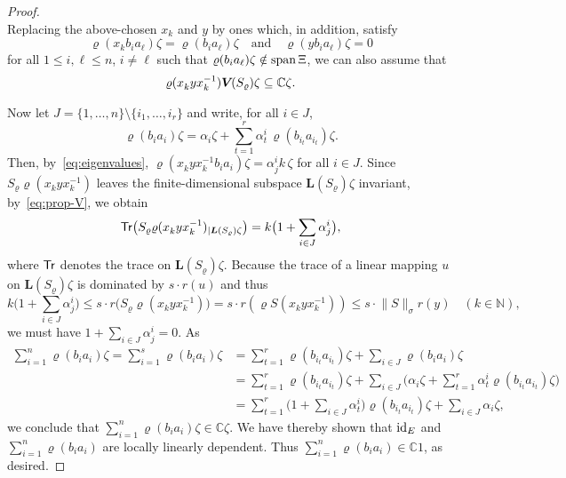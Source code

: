 \documentclass[a4paper,12pt,reqno]{amsart}
\numberwithin{equation}{section}
\theoremstyle{definition}
\begin{document}
\begin{proof}
\begin{equation}
\end{equation}
Replacing the above-chosen $x_k$ and $y$ by ones which, in addition, satisfy
\begin{equation}\label{eq:better-xk-y}
\varrho(x_kb_ia_\ell)\zeta=\varrho(b_ia_\ell)\zeta\quad\text{and}\quad
\varrho(yb_ia_\ell)\zeta=0
\end{equation}
for all $1\leq i,\ell\leq n$, $i\ne\ell$ such that $\varrho(b_ia_\ell)\zeta\notin{{\rm span}}\,\Xi$,
we can also assume that
\begin{equation}\label{eq:prop-V}
\varrho(x_k^{} y x_k^{-1}){{\bm V\mkern-2.5mu(S_\varrho)}}\zeta\subseteq{\mathbb{C}}\zeta.
\end{equation}

Now let $J= \{1, \ldots, n\}\setminus\{i_1, \ldots, i_r\}$ and write, for all $i \in J$,
\[
\varrho (b_i a_i) \zeta= \alpha_i \zeta + \sum_{t=1}^r \alpha_t^i \,\varrho (b_{i_t} a_{i_t}) \zeta.
\]
Then, by~\eqref{eq:eigenvalues}, $\varrho(x_k^{} y x_k^{-1} b_{i} a_{i}) \zeta= \alpha_j^i k\,\zeta$ for all $i \in J$.
Since $S_\varrho\varrho(x_k^{} y x_k^{-1} )$ leaves the finite-dimensional subspace ${{\bm L(S_\varrho)}}\zeta$ invariant, by~\eqref{eq:prop-V},
we obtain
\begin{equation*}
{{\sf Tr}}\bigl(S_\varrho\varrho(x_k^{} y x_k^{-1} )_{|{{\bm L(S_\varrho)}}\zeta}\bigr)= k \bigl(1+ \sum_{i \in J}\alpha_j^i \bigr),
\end{equation*}
where ${{\sf Tr}}$ denotes the trace on ${{\bm L(S_\varrho)}}\zeta$.
Because the trace of a linear mapping $u$ on ${{\bm L(S_\varrho)}}\zeta$ is dominated by $s\cdot r(u)$ and thus
\begin{equation*}
k \bigl(1+ \sum_{i \in J}\alpha_j^i \bigr)\leq s\cdot r\bigl(S_\varrho\varrho(x_k^{} y x_k^{-1})\bigr)
                                                                              = s\cdot r(\varrho S(x_k^{} y x_k^{-1}))
                                                                              \leq s\cdot{{\|{S}\|_\sigma}}r(y)\quad(k\in{\mathbb{N}}),
\end{equation*}
we must have $1+ \sum_{i \in J}\alpha_j^i =0$. As
\begin{equation*}
\begin{split}
\sum_{i=1}^n \varrho(b_i a_i )\zeta= \sum_{i=1}^s \varrho(b_i a_i )\zeta
   &= \sum_{t=1}^r \varrho(b_{i_t} a_{i_t})\zeta + \sum_{i \in J} \varrho(b_i a_i)\zeta\\
   &= \sum_{t=1}^r \varrho(b_{i_t} a_{i_t})\zeta+ \sum_{i \in J} \bigl(\alpha_i\zeta+\sum_{t=1}^r \alpha_t^i \varrho(b_{i_t} a_{i_t})\zeta\bigr)\\
   &= \sum_{t=1}^r \bigl(1+ \sum_{i \in J} \alpha_t^i\bigr) \varrho(b_{i_t} a_{i_t})\zeta + \sum_{i \in J} \alpha_i\zeta,
\end{split}
\end{equation*}
we conclude that $\sum_{i=1}^n \varrho (b_i a_i) \zeta \in \mathbb C \zeta$. We have thereby shown  that $\textup{id}_E$ and
$\sum_{i=1}^n \varrho (b_i a_i)$ are locally linearly dependent. Thus $\sum_{i=1}^n \varrho (b_i a_i) \in {\mathbb{C}} 1$, as desired.
\end{proof}
\end{document}
